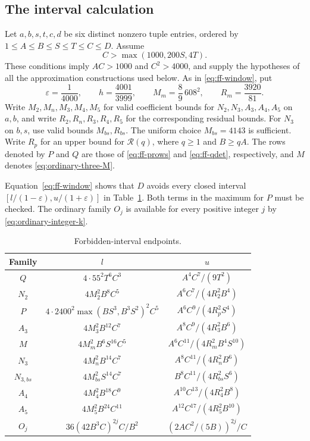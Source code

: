 \documentclass[12pt]{article}
\numberwithin{equation}{section}
\begin{document}
\subsection{The interval calculation}
\label{sec:common-intervals}

Let $a,b,s,t,c,d$ be six distinct nonzero tuple entries, ordered by
$1\le A\le B\le S\le T\le C\le D$. Assume
\[
 C>\max(1000,200S,4T).
\]
These conditions imply $AC>1000$ and $C^2>4000$, and supply the
hypotheses of all the approximation constructions used below.
As in \eqref{eq:ff-window}, put
\[
 \varepsilon=\frac1{4000},\qquad h=\frac{4001}{3999},\qquad
 M_m=\frac89\,608^2,\qquad R_m=\frac{3920}{81}.
\]
Write $M_2,M_n,M_3,M_4,M_5$ for valid coefficient bounds for
$N_2,N_3,A_3,A_4,A_5$ on $a,b$, and write
$R_2,R_n,R_3,R_4,R_5$ for the corresponding residual bounds.
For $N_3$ on $b,s$, use valid bounds $M_{bs},R_{bs}$.
The uniform choice $M_{bs}=4143$ is sufficient.
Write $R_p$ for an upper bound for $\mathcal R(q)$, where
$q\ge1$ and $B\ge qA$.
The rows denoted by $P$ and $Q$ are those of
\eqref{eq:ff-prows} and \eqref{eq:ff-qdet}, respectively,
and $M$ denotes \eqref{eq:ordinary-three-M}.

Equation~\eqref{eq:ff-window} shows that $D$ avoids every closed
interval $[l/(1-\varepsilon),u/(1+\varepsilon)]$ in
Table~\ref{tab:pr-windows}. Both terms in the maximum for $P$ must
be checked. The ordinary family $O_j$ is available for every positive
integer $j$ by \eqref{eq:ordinary-integer-k}.
\begin{table}[htbp]
\centering\small
\caption{Forbidden-interval endpoints.}\label{tab:pr-windows}
\setlength{\tabcolsep}{4pt}
\begin{tabular}{c|c|c}
Family&\(l\)&\(u\)\\\hline
\(Q\)&\(4\cdot55^2T^6C^3\)&\(A^4C^7/(9T^2)\)\\
\(N_2\)&\(4M_2^2B^8C^5\)&\(A^6C^7/(4R_2^2B^4)\)\\
\(P\)&\(4\cdot2400^2\max(BS^3,B^3S^2)^2C^5\)&\(A^6C^9/(4R_p^2S^4)\)\\
\(A_3\)&\(4M_3^2B^{12}C^7\)&\(A^8C^9/(4R_3^2B^6)\)\\
\(M\)&\(4M_m^2B^6S^{16}C^5\)&\(A^6C^{11}/(4R_m^2B^4S^{10})\)\\
\(N_3\)&\(4M_n^2B^{14}C^7\)&\(A^8C^{11}/(4R_n^2B^6)\)\\
\(N_{3,bs}\)&\(4M_{bs}^2S^{14}C^7\)&\(B^8C^{11}/(4R_{bs}^2S^6)\)\\
\(A_4\)&\(4M_4^2B^{18}C^9\)&\(A^{10}C^{13}/(4R_4^2B^8)\)\\
\(A_5\)&\(4M_5^2B^{24}C^{11}\)&\(A^{12}C^{17}/(4R_5^2B^{10})\)\\
\(O_j\)&\(36(42B^3C)^{2j}C/B^2\)&\((2AC^2/(5B))^{2j}/C\)
\end{tabular}
\end{table}
\end{document}

